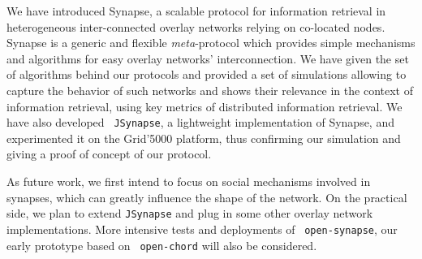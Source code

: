 
We have introduced Synapse, a scalable protocol for information
retrieval in heterogeneous inter-connected overlay networks relying on
co-located nodes.  Synapse is a generic and flexible
\emph{meta}-protocol which provides simple mechanisms and algorithms
for easy overlay networks' interconnection. We have given the set of
algorithms behind our protocols and provided a set of simulations
allowing to capture the behavior of such networks and shows their
relevance in the context of information retrieval, using key metrics
of distributed information retrieval. We have also developed {\tt
JSynapse}, a lightweight implementation of Synapse, and experimented
it on the Grid'5000 platform, thus confirming our simulation and
giving a proof of concept of our protocol.

As future work, we first intend to focus on social mechanisms involved
in synapses, which can greatly influence the shape of the network. On
the practical side, we plan to extend {\tt JSynapse} and plug in some
other overlay network implementations. More intensive tests and
deployments of {~\tt{open-synapse}}, our early prototype based on {\tt
open-chord} will also be considered.
